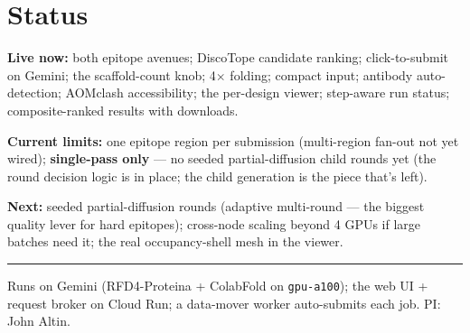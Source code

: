 \documentclass[11pt]{article}
\begin{document}
\section*{Status}
\textbf{Live now:} both epitope avenues; DiscoTope candidate ranking; click-to-submit on Gemini; the
scaffold-count knob; 4$\times$ folding; compact input; antibody auto-detection; AOMclash accessibility;
the per-design viewer; step-aware run status; composite-ranked results with downloads.

\textbf{Current limits:} one epitope region per submission (multi-region fan-out not yet wired);
\textbf{single-pass only} --- no seeded partial-diffusion child rounds yet (the round decision logic is
in place; the child generation is the piece that's left).

\textbf{Next:} seeded partial-diffusion rounds (adaptive multi-round --- the biggest quality lever for
hard epitopes); cross-node scaling beyond 4 GPUs if large batches need it; the real occupancy-shell mesh
in the viewer.

\vspace{4pt}
\rule{\linewidth}{0.4pt}
{\footnotesize Runs on Gemini (RFD4-Proteina + ColabFold on \texttt{gpu-a100}); the web UI + request
broker on Cloud Run; a data-mover worker auto-submits each job. PI: John Altin.}
\end{document}
